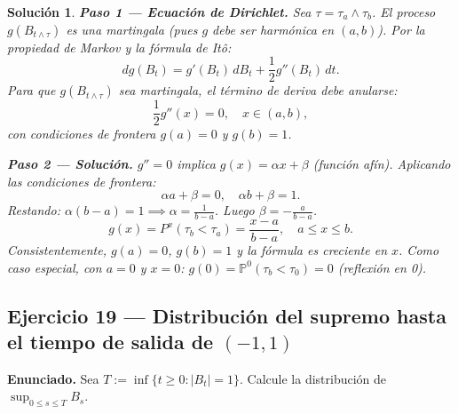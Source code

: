 \documentclass[12pt,letterpaper]{article}
\theoremstyle{ejercicio}
\theoremstyle{solucion}
\newtheorem*{solucion}{Solución}
\renewcommand{\P}{\mathbb{P}}
\begin{document}
\begin{solucion}

\textbf{Paso 1 — Ecuación de Dirichlet.}
Sea $\tau=\tau_a\wedge\tau_b$. El proceso $g(B_{t\wedge\tau})$ es una martingala
(pues $g$ debe ser harmónica en $(a,b)$). Por la propiedad de Markov y la fórmula de Itô:
\[
  dg(B_t) = g'(B_t)\,dB_t + \frac{1}{2}g''(B_t)\,dt.
\]
Para que $g(B_{t\wedge\tau})$ sea martingala, el término de deriva debe anularse:
\[
  \frac{1}{2}g''(x) = 0,\quad x\in(a,b),
\]
con condiciones de frontera $g(a)=0$ y $g(b)=1$.

\textbf{Paso 2 — Solución.}
$g''=0$ implica $g(x)=\alpha x+\beta$ (función afín). Aplicando las condiciones de frontera:
\[
  \alpha a+\beta = 0,\quad \alpha b+\beta=1.
\]
Restando: $\alpha(b-a)=1\implies\alpha=\frac{1}{b-a}$. Luego $\beta=-\frac{a}{b-a}$.
\[
  \boxed{g(x) = P^x(\tau_b<\tau_a) = \frac{x-a}{b-a},\quad a\le x\le b.}
\]
Consistentemente, $g(a)=0$, $g(b)=1$ y la fórmula es creciente en $x$.
Como caso especial, con $a=0$ y $x=0$: $g(0)=\P^0(\tau_b<\tau_0)=0$ (reflexión en 0).
\end{solucion}

\subsection*{Ejercicio 19 — Distribución del supremo hasta el tiempo de salida de $(-1,1)$}

\begin{recuadro}
\textbf{Enunciado.} Sea $T:=\inf\{t\ge 0:|B_t|=1\}$. Calcule la distribución de
$\sup_{0\le s\le T}B_s$.
\end{recuadro}
\end{document}
